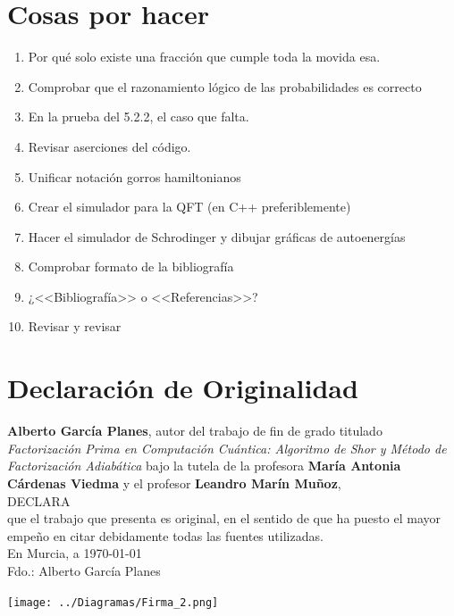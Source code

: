 \documentclass[11pt, spanish]{report}
\numberwithin{equation}{section}
\numberwithin{defin}{section}
\begin{document}
\chapter*{Cosas por hacer}
\begin{enumerate}
\item Por qué solo existe una fracción que cumple toda la movida esa.
\item Comprobar que el razonamiento lógico de las probabilidades es correcto
\item En la prueba del 5.2.2, el caso que falta.
\item Revisar aserciones del código.
\item Unificar notación gorros hamiltonianos
\item Crear el simulador para la QFT (en C++ preferiblemente)
\item Hacer el simulador de Schrodinger y dibujar gráficas de autoenergías
\item Comprobar formato de la bibliografía
\item ¿<<Bibliografía>> o <<Referencias>>?


\item Revisar y revisar
\end{enumerate}

\chapter*{Declaración de Originalidad}
\begin{center}
\textbf{Alberto García Planes}, autor del trabajo de fin de grado titulado \textit{Factorización Prima en Computación Cuántica: Algoritmo de Shor y Método de Factorización Adiabática} bajo la tutela de la profesora \textbf{María Antonia Cárdenas Viedma} y el profesor \textbf{Leandro Marín Muñoz},\\[1cm]

DECLARA\\[1cm]

que el trabajo que presenta es original, en el sentido de que ha puesto el
mayor empeño en citar debidamente todas las fuentes utilizadas.\\[1.5cm]

En Murcia, a \today \\[2.7cm]

Fdo.: Alberto García Planes

\texttt{[image: ../Diagramas/Firma\_2.png]}
\end{center}
\end{document}
